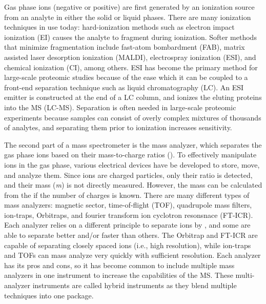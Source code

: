 Gas phase ions (negative or positive) are first generated by an ionization source from an analyte in either the solid or liquid phases. There are many ionization techniques in use today: hard-ionization methods such as electron impact ionization (EI) causes the analyte to fragment during ionization. Softer methods that minimize fragmentation include fast-atom bombardment (FAB)\cite{fab}, matrix assisted laser desorption ionization (MALDI)\cite{maldi,maldi2}, electrospray ionization (ESI)\cite{esi}, and chemical ionization (CI)\cite{ci}, among others. ESI has become the primary method for large-scale proteomic studies because of the ease which it can be coupled to a front-end separation technique such as liquid chromatography (LC). An ESI emitter is constructed at the end of a LC column, and ionizes the eluting proteins into the MS (LC-MS). Separation is often needed in large-scale proteomic experiments because samples can consist of overly complex mixtures of thousands of analytes, and separating them prior to ionization increases sensitivity. 

The second part of a mass spectrometer is the mass analyzer, which separates the gas phase ions based on their mass-to-charge ratios (\mz{}). To effectively manipulate ions in the gas phase, various electrical devices have be developed to store, move, and analyze them. Since ions are charged particles, only their \mz{} ratio is detected, and their mass (\emph{m}) is not directly measured. However, the mass can be calculated from the \mz{} if the number of charges is known. There are many different types of mass analyzers: magnetic sector, time-of-flight (TOF)\cite{tof}, quadrupole mass filters\cite{iontrap}, ion-traps\cite{iontrap2}, Orbitraps\cite{orbitrap}, and fourier transform ion cyclotron resonsnace (FT-ICR)\cite{fticr}. Each analyzer relies on a different principle to separate ions by \mz{}, and some are able to separate better and/or faster than others. The Orbitrap and FT-ICR are capable of separating closely spaced \mz{} ions (i.e., high resolution), while ion-traps and TOFs can mass analyze very quickly with sufficient resolution. Each analyzer has its pros and cons, so it has become common to include multiple mass analyzers in one instrument to increase the capabilities of the MS. These multi-analyzer instruments are called hybrid instruments as they blend multiple techniques into one package.

